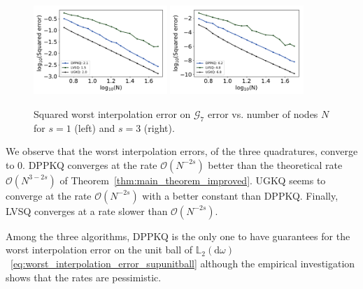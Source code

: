 \documentclass[twoside,11pt]{book}
\numberwithin{theorem}{chapter}
\numberwithin{definition}{chapter}
\numberwithin{proposition}{chapter}
\numberwithin{corollary}{chapter}
\numberwithin{example}{chapter}
\numberwithin{lemma}{chapter}
\DeclareMathOperator{\X}{\mathcal{X}}
\begin{document}
\begin{figure}
\centering
\includegraphics[width=0.45\textwidth]{img/neurips/Sobolev/suponunitball_interpolation_pSobolev_s_1_binarycubeM_64_fig_1.pdf}
\includegraphics[width=0.45\textwidth]{img/neurips/Sobolev/suponunitball_interpolation_pSobolev_s_3_binarycubeM_64_fig_1.pdf}\\
\caption{Squared worst interpolation error on $\mathcal{G}_{7}$ error vs. number of nodes $N$ for $s = 1$ (left) and $s=3$ (right).
\label{fig:pDPP_results_pSobolev_exp_3_G7}}
\end{figure}
We observe that the worst interpolation errors, of the three quadratures, converge  to $0$. DPPKQ converges at the rate $\mathcal{O}(N^{-2s})$ better than the theoretical rate $\mathcal{O}(N^{3-2s})$ of Theorem~\ref{thm:main_theorem_improved}. UGKQ seems to converge at the rate $\mathcal{O}(N^{-2s})$ with a better constant than DPPKQ. Finally, LVSQ converges at a rate slower than $\mathcal{O}(N^{-2s})$. 

Among the three algorithms, DPPKQ is the only one to have guarantees for the worst interpolation error on the unit ball of $\mathbb{L}_{2}(\mathrm{d}\omega)$~\eqref{eq:worst_interpolation_error_supunitball} although the empirical investigation shows that the rates are pessimistic.
\end{document}
